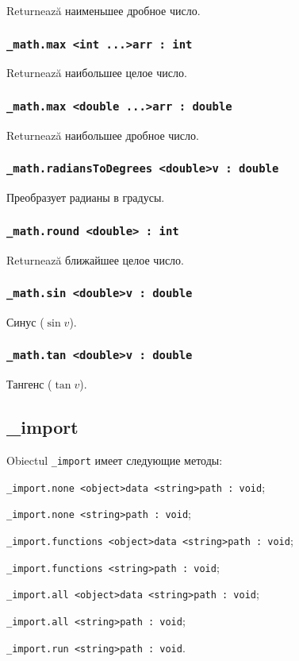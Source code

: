 Returnează наименьшее дробное число.

\subsubsection{\lstinline|_math.max <int ...>arr : int|}

Returnează наибольшее целое число.

\subsubsection{\lstinline|_math.max <double ...>arr : double|}

Returnează наибольшее дробное число.

\subsubsection{\lstinline|_math.radiansToDegrees <double>v : double|}

Преобразует радианы в градусы.

\subsubsection{\lstinline|_math.round <double> : int|}

Returnează ближайшее целое число.

\subsubsection{\lstinline|_math.sin <double>v : double|}

Синус ($\sin{v}$).

\subsubsection{\lstinline|_math.tan <double>v : double|}

Тангенс ($\tan{v}$).

\subsection{{\color{orange} \_import}}

Obiectul \lstinline|_import| имеет следующие методы:
\begin{icItems}
	\item \lstinline|_import.none <object>data <string>path : void|;
	\item \lstinline|_import.none <string>path : void|;
	\item \lstinline|_import.functions <object>data <string>path : void|;
	\item \lstinline|_import.functions <string>path : void|;
	\item \lstinline|_import.all <object>data <string>path : void|;
	\item \lstinline|_import.all <string>path : void|;
	\item \lstinline|_import.run <string>path : void|.
\end{icItems}

